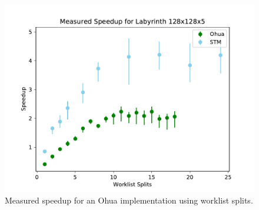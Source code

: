
\begin{figure}[h]
    \centering
    \includegraphics[width=.5\textwidth,keepaspectratio]{gfx/preliminaries-labyrinth/split_128x128x5}
    \caption{Measured speedup for an Ohua implementation using worklist splits.}%
    \label{fig:preliminaries:split-results}
\end{figure}

